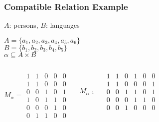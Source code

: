 \documentclass[dvipsnames]{beamer}
\begin{document}
\begin{frame}
  \frametitle{Compatible Relation Example}

  \begin{example}
    $A$: persons, $B$: languages

    \medskip
    $A=\{a_1,a_2,a_3,a_4,a_5,a_6\}$\\
    $B=\{b_1,b_2,b_3,b_4,b_5\}$\\
    $\alpha \subseteq A \times B$

    \pause
    \begin{columns}
      \[ M_\alpha = \begin{array}{|ccccc|}
          1  &  1  &  0  &  0  &  0\\
          1  &  1  &  0  &  0  &  0\\
          0  &  0  &  1  &  0  &  1\\
          1  &  0  &  1  &  1  &  0\\
          0  &  0  &  0  &  1  &  0\\
          0  &  1  &  1  &  0  &  0
        \end{array} \]

      \[ M_{\alpha^{-1}} = \begin{array}{|cccccc|}
          1  &  1  &  0  &  1  &  0  &  0\\
          1  &  1  &  0  &  0  &  0  &  1\\
          0  &  0  &  1  &  1  &  0  &  1\\
          0  &  0  &  0  &  1  &  1  &  0\\
          0  &  0  &  1  &  0  &  0  &  0
        \end{array} \]
    \end{columns}
  \end{example}
\end{frame}
\end{document}
